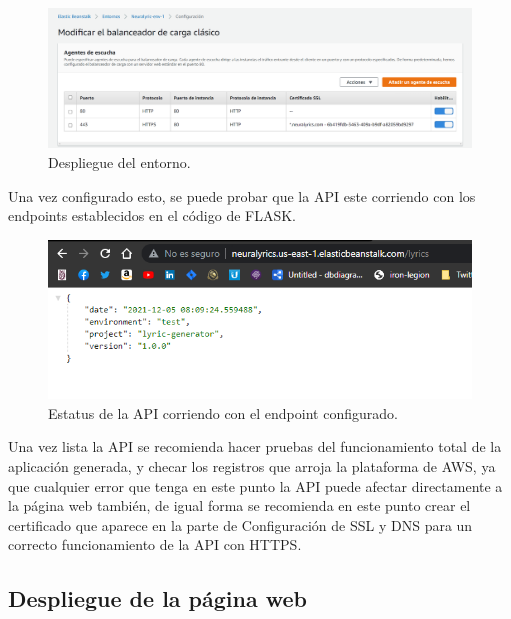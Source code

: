 \documentclass[12pt, a4paper, titlepage]{article}
\begin{document}
		\begin{figure}[H]
			\includegraphics[width=12cm]{./Imagenes/BackEnd/config_balanceador.png}
			\centering 
			\caption{Despliegue del entorno.}
		\end{figure}
		Una vez configurado esto, se puede probar que la API este corriendo con los endpoints establecidos en el código de FLASK.
		\begin{figure}[H]
			\includegraphics[width=12cm]{./Imagenes/BackEnd/api_corriendo.png}
			\centering 
			\caption{Estatus de la API corriendo con el endpoint configurado.}
		\end{figure}
		Una vez lista la API se recomienda hacer pruebas del funcionamiento total de la aplicación generada, y checar los registros que arroja la plataforma de AWS, ya que cualquier error que tenga en este punto la API puede afectar directamente a la página web también, de igual forma se recomienda en este punto crear el certificado que aparece en la parte de Configuración de SSL y DNS para un correcto funcionamiento de la API con HTTPS.
	\newpage
	\subsection{Despliegue de la página web}
	
\end{document}
